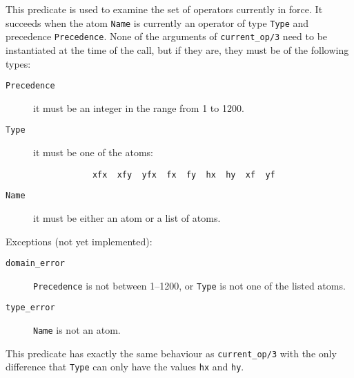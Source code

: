 \begin{description}
    This predicate is used to examine the set of operators currently in force.
    It succeeds when the atom {\tt Name} is currently an operator of type 
    {\tt Type} and precedence {\tt Precedence}.  None of the arguments of
    {\tt current\_op/3} need to be instantiated at the time of the call, 
    but if they are, they must be of the following types:
    \begin{description}
    \item[{\tt Precedence}] 
	it must be an integer in the range from 1 to 1200.
    \item[{\tt Type}]
	it must be one of the atoms:
	\begin{verbatim}
	        xfx  xfy  yfx  fx  fy  hx  hy  xf  yf
	\end{verbatim}
    \item[{\tt Name}]
	it must be either an atom or a list of atoms.
    \end{description}

    Exceptions (not yet implemented):
    \begin{description}
    \item[{\tt domain\_error}]
	{\tt Precedence} is not between 1--1200, or {\tt Type} is not one
	of the listed atoms.
    \item[{\tt type\_error}]
	{\tt Name} is not an atom.
    \end{description}

    This predicate has exactly the same behaviour as {\tt current\_op/3}
    with the only difference that {\tt Type} can only have the values
    {\tt hx} and {\tt hy}.
\end{description}


